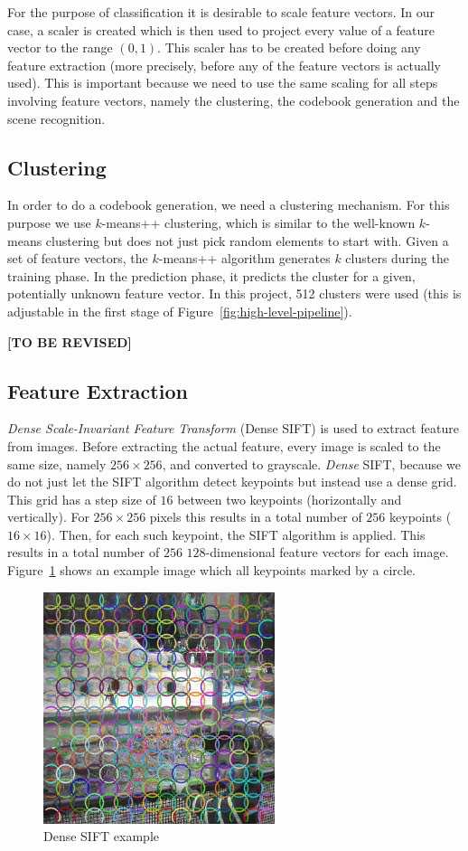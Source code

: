 \documentclass{vldb}
\newcommand{\tbr}{{\color{red}\textbf{[TO BE REVISED]}}}
\begin{document}
For the purpose of classification it is desirable to scale feature vectors. In
our case, a scaler is created which is then used to project every value of a
feature vector to the range $(0, 1)$. This scaler has to be created before doing any
feature extraction (more precisely, before any of the feature vectors is actually
used). This is important because we need to use the same scaling for all steps
involving feature vectors, namely the clustering, the codebook generation
and the scene recognition.

\subsection{Clustering}
\label{subsec:clustering}

In order to do a codebook generation, we need a clustering mechanism. For this
purpose we use $k$-means++ clustering, which is similar to the well-known
$k$-means clustering but does not just pick random elements to start with.
Given a set of feature vectors, the $k$-means++ algorithm generates $k$ clusters
during the training phase. In the prediction phase, it predicts the cluster for
a given, potentially unknown feature vector. In this project, 512 clusters were
used (this is adjustable in the first stage of
Figure~\ref{fig:high-level-pipeline}).

\tbr

\subsection{Feature Extraction}
\label{subsec:feature-extraction}

\emph{Dense Scale-Invariant Feature Transform} (Dense SIFT) is used to extract
feature from images. Before extracting the actual feature, every image is scaled
to the same size, namely $256\times256$, and converted to grayscale.
\emph{Dense} SIFT, because we do not just let the SIFT algorithm detect keypoints
but instead use a dense grid. This grid has a step size of $16$ between two
keypoints (horizontally and vertically). For $256\times256$ pixels this results
in a total number of $256$ keypoints ($16\times16$). Then, for each such keypoint,
the SIFT algorithm is applied. This results in a total number of $256$
$128$-dimensional feature vectors for each image.
Figure~\ref{fig:dense-sift-example} shows an example image which all keypoints
marked by a circle.

\begin{figure}
  \centering
  \includegraphics[width = .25\textwidth]{figs/dense_sift.jpg}
  \caption{Dense SIFT example}
  \label{fig:dense-sift-example}
\end{figure}
\end{document}
